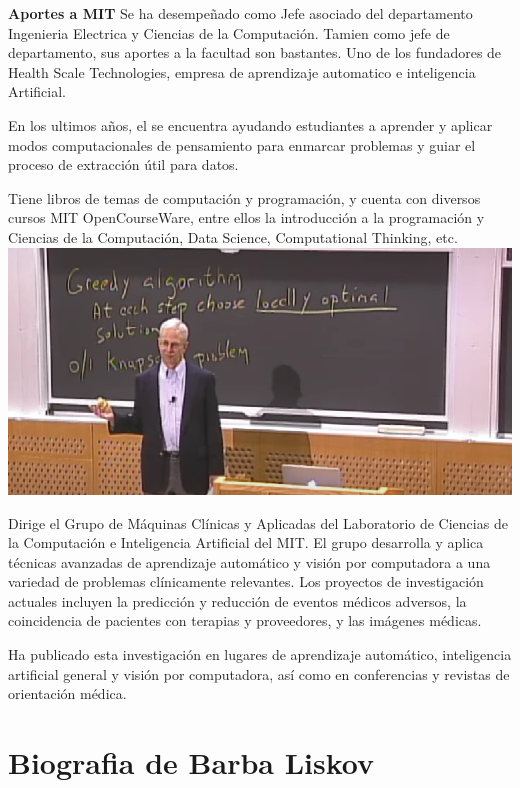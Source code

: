 \documentclass{article}
\begin{document}
\textbf{Aportes a MIT}
Se ha desempeñado como Jefe asociado del departamento Ingenieria Electrica y Ciencias de la Computación. Tamien como jefe de departamento, sus aportes a la facultad son bastantes. Uno de los fundadores de Health Scale Technologies, empresa de aprendizaje automatico e inteligencia Artificial.\\ 
\par En los ultimos años, el se encuentra ayudando estudiantes a aprender y aplicar modos computacionales de pensamiento para enmarcar problemas y guiar el proceso de extracción útil para datos.\\
\par Tiene libros de temas de computación y programación, y cuenta con diversos cursos MIT OpenCourseWare, entre ellos la introducción a la programación y Ciencias de la Computación, Data Science, Computational Thinking, etc.\\

\includegraphics[scale=0.45]{image2.png}

\par Dirige el Grupo de Máquinas Clínicas y Aplicadas del Laboratorio de Ciencias de la Computación e Inteligencia Artificial del MIT. El grupo desarrolla y aplica técnicas avanzadas de aprendizaje automático y visión por computadora a una variedad de problemas clínicamente relevantes. Los proyectos de investigación actuales incluyen la predicción y reducción de eventos médicos adversos, la coincidencia de pacientes con terapias y proveedores, y las imágenes médicas.\\
\par Ha publicado esta investigación en lugares de aprendizaje automático, inteligencia artificial general y visión por computadora, así como en conferencias y revistas de orientación médica.

\section{Biografia de Barba Liskov}
\end{document}
